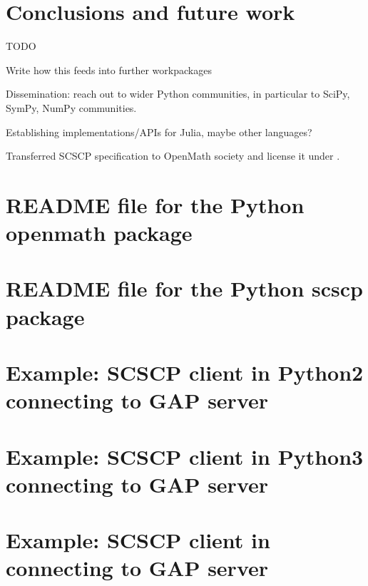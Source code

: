 \documentclass{deliverablereport}
\begin{document}
\section{Conclusions and future work}

TODO

Write how this feeds into further workpackages

Dissemination: reach out to wider Python communities,
in particular to SciPy, SymPy, NumPy communities.

Establishing implementations/APIs for Julia, maybe other languages?

Transferred SCSCP specification to OpenMath society and license it 
under .


\printbibliography

\newpage
\appendix

\section{README file for the Python openmath package}\label{py-openmath_README}


\section{README file for the Python scscp package}\label{py-scscp_README}


\section{Example: SCSCP client in Python2 connecting to GAP server}\label{python2-to-GAP}


\section{Example: SCSCP client in Python3 connecting to GAP server}\label{python3-to-GAP}


\section{Example: SCSCP client in \Sage connecting to GAP server}\label{SageMath-to-GAP}

\end{document}
